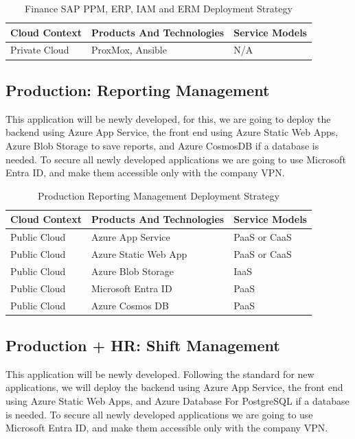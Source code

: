 \documentclass{llncs}
\begin{document}
\begin{table}[h!]
    \centering
    \begin{tabular}{lll}
        \hline
        \textbf{Cloud Context} & \textbf{Products And Technologies} & \textbf{Service Models} \\
        \hline
 Private Cloud          & ProxMox, Ansible                   & N/A                     \\
        \hline
    \end{tabular}
    \caption{Finance SAP PPM, ERP, IAM and ERM Deployment Strategy}
\end{table}

\subsection{Production: Reporting Management}
This application will be newly developed, for this, we are going to deploy the backend using Azure App Service, the front end using Azure Static Web Apps, Azure Blob Storage to save reports, and Azure CosmosDB if a database is needed.
To secure all newly developed applications we are going to use Microsoft Entra ID, and make them accessible only with the company VPN.\\
\begin{table}[h!]
    \centering
    \begin{tabular}{lll}
        \hline
        \textbf{Cloud Context} & \textbf{Products And Technologies} & \textbf{Service Models} \\
        \hline
 Public Cloud           & Azure App Service                  & PaaS or CaaS            \\
        \hline
 Public Cloud           & Azure Static Web App               & PaaS or CaaS            \\
        \hline
 Public Cloud           & Azure Blob Storage                 & IaaS                    \\
        \hline
 Public Cloud           & Microsoft Entra ID                 & PaaS                    \\
        \hline
 Public Cloud           & Azure Cosmos DB                    & PaaS                    \\
        \hline
    \end{tabular}
    \caption{Production Reporting Management Deployment Strategy}
\end{table}


\subsection{Production + HR: Shift Management}
This application will be newly developed. Following the standard for new applications, we will deploy the backend using Azure App Service, the front end using Azure Static Web Apps, and Azure Database For PostgreSQL if a database is needed.
To secure all newly developed applications we are going to use Microsoft Entra ID, and make them accessible only with the company VPN.\\
\end{document}
